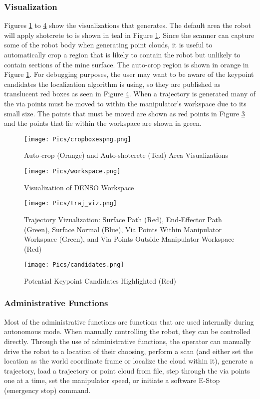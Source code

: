 \subsubsection{Visualization}
Figures \ref{fig:cropb} to \ref{fig:cands} show the visualizations that  generates. The default area the robot will apply shotcrete to is shown in teal in Figure \ref{fig:cropb}. Since the scanner can capture some of the robot body when generating point clouds, it is useful to automatically crop a region that is likely to contain the robot but unlikely to contain sections of the mine surface. The auto-crop region is shown in orange in Figure \ref{fig:cropb}. For debugging purposes, the user may want to be aware of the keypoint candidates the localization algorithm is using, so they are published as translucent red boxes as seen in Figure \ref{fig:cands}. When a trajectory is generated many of the via points must be moved to within the manipulator's workspace due to its small size. The points that must be moved are shown as red points in Figure \ref{fig:trajviz} and the points that lie within the workspace are shown in green.\\
\begin{figure}[h]
    \centering
    \texttt{[image: Pics/cropboxespng.png]}
    \caption{Auto-crop (Orange) and Auto-shotcrete (Teal) Area Visualizations}
    \label{fig:cropb}
\end{figure}
\begin{figure}[h]
    \centering
    \texttt{[image: Pics/workspace.png]}
    \caption{Visualization of DENSO Workspace}
    \label{fig:worksp}
\end{figure}
\begin{figure}[h]
    \centering
    \texttt{[image: Pics/traj\_viz.png]}
    \caption{Trajectory Vizualization: Surface Path (Red), End-Effector Path (Green), Surface Normal (Blue), Via Points Within Manipulator Workspace (Green), and Via Points Outside Manipulator Workspace (Red)}
    \label{fig:trajviz}
\end{figure}
\begin{figure}[h]
    \centering
    \texttt{[image: Pics/candidates.png]}
    \caption{Potential Keypoint Candidates Highlighted (Red)}
    \label{fig:cands}
\end{figure}
\subsubsection{Administrative Functions}
\label{sub:admin}
Most of the administrative functions are functions that are used internally during autonomous mode. When manually controlling the robot, they can be controlled directly. Through the use of administrative functions, the operator can manually drive the robot to a location of their choosing, perform a scan (and either set the location as the world coordinate frame or localize the cloud within it), generate a trajectory, load a trajectory or point cloud from file, step through the via points one at a time, set the manipulator speed, or initiate a software E-Stop (emergency stop) command. \\

